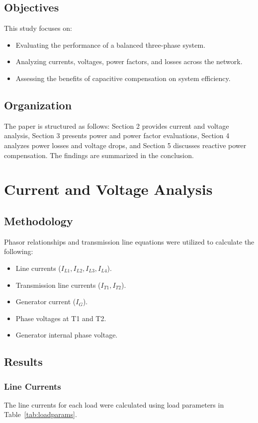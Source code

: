 \documentclass[conference]{IEEEtran}
\begin{document}
\subsection{Objectives}
This study focuses on:
\begin{itemize}
    \item Evaluating the performance of a balanced three-phase system.
    \item Analyzing currents, voltages, power factors, and losses across the network.
    \item Assessing the benefits of capacitive compensation on system efficiency.
\end{itemize}

\subsection{Organization}
The paper is structured as follows: Section 2 provides current and voltage analysis, Section 3 presents power and power factor evaluations, Section 4 analyzes power losses and voltage drops, and Section 5 discusses reactive power compensation. The findings are summarized in the conclusion.

\section{Current and Voltage Analysis}

\subsection{Methodology}
Phasor relationships and transmission line equations were utilized to calculate the following:
\begin{itemize}
    \item Line currents ($I_{L1}, I_{L2}, I_{L3}, I_{L4}$).
    \item Transmission line currents ($I_{T1}, I_{T2}$).
    \item Generator current ($I_{G}$).
    \item Phase voltages at T1 and T2.
    \item Generator internal phase voltage.
\end{itemize}

\subsection{Results}
\subsubsection{Line Currents}
The line currents for each load were calculated using load parameters in Table~\ref{tab:loadparams}.
\end{document}
